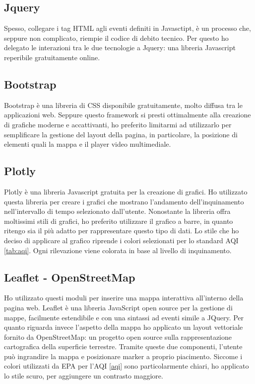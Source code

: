 \subsection{Jquery}
Spesso, collegare i tag HTML agli eventi definiti in Javasctipt, è un processo che, seppure non complicato, riempie il codice di debito tecnico.
Per questo ho delegato le interazioni tra le due tecnologie a Jquery: una libreria Javascript reperibile gratuitamente online.

\subsection{Bootstrap}
Bootstrap è una libreria di CSS disponibile gratuitamente, molto diffusa tra le applicazioni web.
Seppure questo framework si presti ottimalmente alla creazione di grafiche moderne e accattivanti, ho preferito limitarmi ad utilizzarlo per semplificare la gestione del layout della pagina, in particolare,
la posizione di elementi quali la mappa e il player video multimediale.

\subsection{Plotly}
Plotly è una libreria Javascript gratuita per la creazione di grafici.
Ho utilizzato questa libreria per creare i grafici che mostrano l'andamento dell'inquinamento nell'intervallo di tempo selezionato dall'utente.
Nonostante la libreria offra moltissimi stili di grafici, ho preferito utilizzare il grafico a barre, in quanto ritengo sia il più adatto per rappresentare questo tipo di dati.
Lo stile che ho deciso di applicare al grafico riprende i colori selezionati per lo standard AQI \ref{tab:aqi}. Ogni rilevazione viene colorata in base al livello di inquinamento.

\subsection{Leaflet - OpenStreetMap}
Ho utilizzato questi moduli per inserire una mappa interattiva all'interno della pagina web.
Leaflet è una libreria JavaScript open source per la gestione di mappe, facilmente estendibile e con una sintassi ad eventi simile a JQuery.
Per quanto riguarda invece l'aspetto della mappa ho applicato un layout vettoriale fornito da OpenStreetMap: un progetto open source sulla rappresentazione cartografica della superficie terrestre.
Tramite queste due componenti, l'utente può ingrandire la mappa e posizionare marker a proprio piacimento.
Siccome i colori utilizzati da EPA per l'AQI \ref{aqi} sono particolarmente chiari, ho applicato lo stile scuro, per aggiungere un contrasto maggiore.

